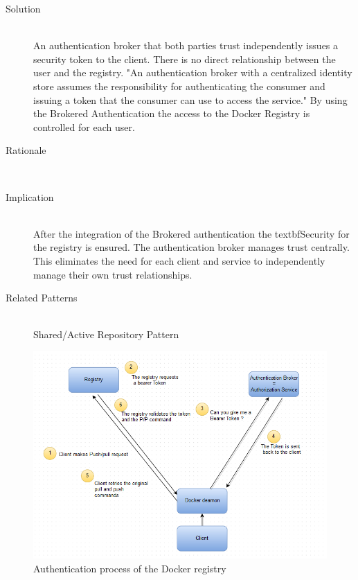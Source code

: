 \begin{description}
\item[Solution]~\\ 
An authentication broker that both parties trust independently issues a security token to the client. There is no direct relationship between the user and the registry.
"An authentication broker with a centralized identity store assumes the responsibility for authenticating the consumer and issuing a token that the consumer can use to access the service."
By using the Brokered Authentication the access to the Docker Registry is controlled for each user.


\item[Rationale]~\\ 

\item[Implication]~\\ After the integration of the Brokered authentication the textbf{Security} for the registry is ensured. %
The authentication broker manages trust centrally. This eliminates the need for each client and service to independently manage their own trust relationships.

\item [Related Patterns]~\\
Shared/Active Repository Pattern

\end{description}

\begin{figure}[H]
\centering
\includegraphics[scale=0.7]{5-patterns/images/Authentication.png}
\caption{Authentication process of the Docker registry }
\label{fig:auth-process}
\end{figure}

